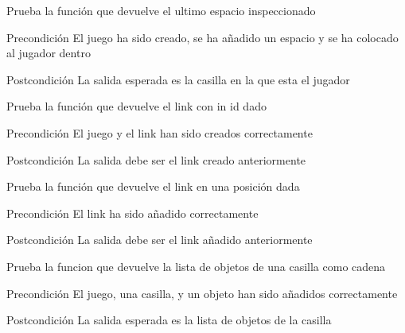 \begin{DoxyRefList}
\item[\label{test__test000101}%
\hypertarget{test__test000101}{}%
Global \hyperlink{game__test_8c_add2a05fd17803c1d5ed27c2cbe87f215}{test1\-\_\-game\-\_\-get\-\_\-last\-\_\-inspected\-\_\-space} ()]Prueba la función que devuelve el ultimo espacio inspeccionado \begin{DoxyPrecond}{Precondición}
El juego ha sido creado, se ha añadido un espacio y se ha colocado al jugador dentro 
\end{DoxyPrecond}
\begin{DoxyPostcond}{Postcondición}
La salida esperada es la casilla en la que esta el jugador  
\end{DoxyPostcond}

\item[\label{test__test000080}%
\hypertarget{test__test000080}{}%
Global \hyperlink{game__test_8c_ae0841f160573a442bf3eaae6f38efbb0}{test1\-\_\-game\-\_\-get\-\_\-link} ()]Prueba la función que devuelve el link con in id dado \begin{DoxyPrecond}{Precondición}
El juego y el link han sido creados correctamente 
\end{DoxyPrecond}
\begin{DoxyPostcond}{Postcondición}
La salida debe ser el link creado anteriormente  
\end{DoxyPostcond}

\item[\label{test__test000083}%
\hypertarget{test__test000083}{}%
Global \hyperlink{game__test_8c_ae6a05ed8389de63b9597a321690f8260}{test1\-\_\-game\-\_\-get\-\_\-link\-\_\-at} ()]Prueba la función que devuelve el link en una posición dada \begin{DoxyPrecond}{Precondición}
El link ha sido añadido correctamente 
\end{DoxyPrecond}
\begin{DoxyPostcond}{Postcondición}
La salida debe ser el link añadido anteriormente  
\end{DoxyPostcond}

\item[\label{test__test000099}%
\hypertarget{test__test000099}{}%
Global \hyperlink{game__test_8c_aeb01592562e89e3cb527196559c72dda}{test1\-\_\-game\-\_\-get\-\_\-obj\-\_\-list\-\_\-as\-\_\-str} ()]Prueba la funcion que devuelve la lista de objetos de una casilla como cadena \begin{DoxyPrecond}{Precondición}
El juego, una casilla, y un objeto han sido añadidos correctamente 
\end{DoxyPrecond}
\begin{DoxyPostcond}{Postcondición}
La salida esperada es la lista de objetos de la casilla  
\end{DoxyPostcond}


\end{DoxyRefList}
